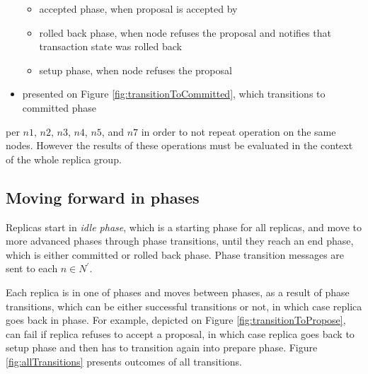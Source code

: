 \begin{itemize}
	\begin{itemize}
		\item accepted phase, when proposal is accepted by 
		\item rolled back phase, when node  refuses the proposal and notifies that transaction state \txState was rolled back
		\item setup phase, when node  refuses the proposal
	\end{itemize}
\item \commitTransition presented on Figure \ref{fig:transitionToCommitted}, which transitions to committed phase
\end{itemize}

















 per $n1$, $n2$, $n3$, $n4$, $n5$, and $n7$ in order to not repeat operation on the same nodes. However the results of
 these operations must be evaluated in the context of the whole replica group.


\subsection{Moving forward in phases}
Replicas start in \emph{idle phase}, which is a starting phase for all replicas, and move to more advanced phases through phase transitions, until they reach an end phase, which is either committed or rolled back phase. Phase transition messages are sent to each $n\in \mathit{N}^'$.

Each replica is in one of phases and moves between phases, as a result of phase transitions, which can be either successful transitions or not, in which case replica goes back in phase. 
For example, \proposeTransition depicted on Figure \ref{fig:transitionToPropose}, can fail if replica refuses to accept a proposal, in which case replica goes back to setup phase and then has to transition again into prepare phase. Figure \ref{fig:allTransitions} presents outcomes of all transitions.

